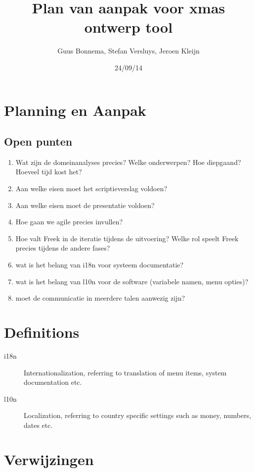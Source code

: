 \documentclass[a4paper,11pt]{article}
\author{Guus Bonnema, Stefan Versluys, Jeroen Kleijn}
\date{24/09/14}
\title{Plan van aanpak voor xmas ontwerp tool}
\begin{document}





\section{Planning en Aanpak}





\subsection{Open punten}

\begin{enumerate}
 \item Wat zijn de domeinanalyses precies? Welke onderwerpen? Hoe diepgaand? Hoeveel tijd kost het?
 \item Aan welke eisen moet het scriptieverslag voldoen?
 \item Aan welke eisen moet de presentatie voldoen?
 \item Hoe gaan we agile precies invullen?
 \item Hoe valt Freek in de iteratie tijdens de uitvoering? Welke rol speelt Freek precies tijdens de andere fases?
 \item wat is het belang van i18n voor systeem documentatie?
 \item wat is het belang van l10n voor de software (variabele namen, menu opties)?
 \item moet de communicatie in meerdere talen aanwezig zijn?
\end{enumerate}


\appendix
\section{Definitions}

\begin{description}
 \item[i18n] Internationalization, referring to translation of menu items, system documentation etc.
 \item[l10n] Localization, referring to country specific settings such as money, numbers, dates etc.
\end{description}
\section{Verwijzingen}


\end{document}
